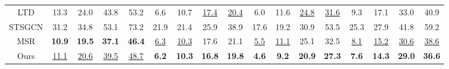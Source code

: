 \begin{table}[ht]
{\begin{tabular}{c|cccc|cccc|cccc|cccc}
    LTD          & 13.3          & 24.0          & 43.8          & 53.2          & 6.6          & 10.7          & \underline{17.4}          & \underline{20.4}          & 6.0          & 11.6         & \underline{24.8}          & \underline{31.6}          & 9.3           & 17.1          & 33.0          & 40.9          \\
    
    STSGCN      &31.2      &34.8            &53.1           &73.2           &21.9                     &21.4         &25.9           &38.9               &17.6      &19.2                    &30.9      &53.5      &25.3         &27.9           &41.8      &59.2 \\
    MSR          & \textbf{10.9} & \textbf{19.5} & \textbf{37.1} & \textbf{46.4} & \underline{6.3}          & \underline{10.3}          & 17.6          & 21.1          & \underline{5.5}          & \underline{11.1}         & 25.1          & 32.5          & \underline{8.1}           & \underline{15.2}          & \underline{30.6}          & \underline{38.6}          \\
    Ours          & \underline{11.1}          & \underline{20.6}          & \underline{39.5}          & \underline{48.7}          & \textbf{6.2} & \textbf{10.3} & \textbf{16.8} & \textbf{19.8} & \textbf{4.6} & \textbf{9.2} & \textbf{20.9} & \textbf{27.3} & \textbf{7.6}  & \textbf{14.3}  & \textbf{29.0} & \textbf{36.6} \\ \hline
    \end{tabular} 
    }
    \label{table:CMU_short_term}
    \end{table}
    
